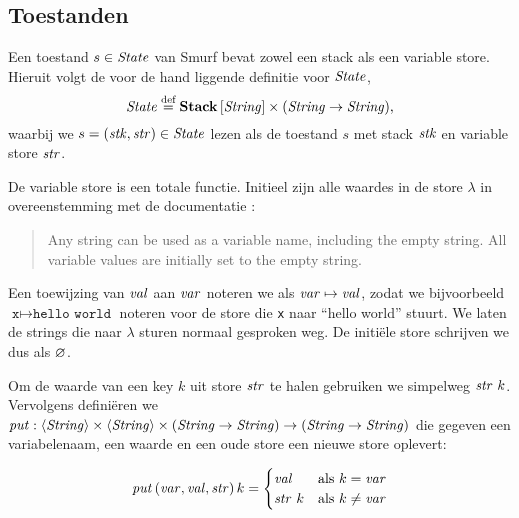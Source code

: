 \subsection{Toestanden}
\label{sec:def:state}

Een toestand $s\in\mathit{State}$ van Smurf bevat zowel een stack als een variable
store. Hieruit volgt de voor de hand liggende definitie voor $\mathit{State}$,
$$\mathit{State} \stackrel{\text{def}}{=} \mathbf{Stack}\left[\mathit{\mathit{String}}\right] \times (\mathit{String} \to \mathit{String}),$$
waarbij we $s=(\mathit{stk},\mathit{str})\in\mathit{State}$ lezen als de toestand $s$ met stack $\mathit{stk}$
en variable store $\mathit{str}$.

De variable store is een totale functie. Initieel zijn alle waardes in de store
$\lambda$ in overeenstemming met de documentatie \cite{safalra}:

\begin{quote}
	Any string can be used as a variable name, including the empty string. All
	variable values are initially set to the empty string.
\end{quote}

Een toewijzing van $\mathit{val}$ aan $\mathit{var}$ noteren we als $\mathit{var}\mapsto\mathit{val}$, zodat we
bijvoorbeeld $\texttt{x}\mapsto\texttt{hello world}$ noteren voor de store
die \texttt{x} naar ``hello world'' stuurt. We laten de strings die naar
$\lambda$ sturen normaal gesproken weg. De initiële store schrijven we dus als
$\varnothing$.

Om de waarde van een key $k$ uit store $\mathit{str}$ te halen gebruiken we simpelweg
$\mathit{str}~k$. Vervolgens definiëren we $\mathit{put}:\langle\mathit{String}\rangle \times \langle\mathit{String}\rangle \times
(\mathit{String}\to\mathit{String}) \to (\mathit{String}\to\mathit{String})$ die gegeven een variabelenaam, een
waarde en een oude store een nieuwe store oplevert:

$$
	\mathit{put}\left(\mathit{var}, \mathit{val}, \mathit{str}\right) k =
		\begin{cases}
			\mathit{val}   & \text{als $k=\mathit{var}$} \\
			\mathit{str}~k & \text{als $k\ne\mathit{var}$}
		\end{cases}
$$

